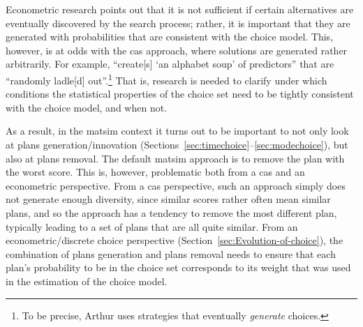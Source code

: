Econometric research \citep[e.g.][Chapter 8 and 9]{BenAkivaLerman_1985} points out that it is not sufficient if certain alternatives are eventually discovered by the search process; rather, it is important that they are generated with %
probabilities that are consistent with the choice model.
%
This, however, is at odds with the \acrfull{cas} approach, where solutions are generated rather arbitrarily.  For example, \citet{ArthurBar} ``create[s] `an alphabet soup' of predictors'' that are ``randomly ladle[d] out''.\footnote{%
%
%
To be precise, Arthur uses strategies that eventually \emph{generate} choices.
%
}
That is, research is needed to clarify under which conditions the statistical properties of the choice set need to be tightly consistent with the choice model, and when not.

 

As a result, in the \gls{matsim} context it turns out to be important to not only look at plans generation/innovation (\eg Sections~\ref{sec:timechoice}--\ref{sec:modechoice}), but also at plans removal.  The default \gls{matsim} approach is to remove the plan with the worst score.  This is, however, problematic both from a \gls{cas} and an econometric perspective.  
%
From a \gls{cas} perspective, such an approach simply does not generate enough diversity, since similar scores rather often mean similar plans, and so the approach has a tendency to remove the most different plan, typically leading to a set of plans that are all quite similar.
%
From an econometric/discrete choice perspective (\cf Section~\ref{sec:Evolution-of-choice}), the combination of plans generation and plans removal needs to ensure that each plan's probability to be in the choice set corresponds to its weight that was used in the estimation of the choice model.

